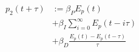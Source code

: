 \begin{equation}
\begin{split}
	p_2(t+\tau) &:= \beta_P E_{p}(t)\\
	&+ \beta_I \sum_{i=0}^\infty E_{p}(t-i\tau)\\
	&+ \beta_D \frac{E_{p}(t)-E_{p}(t-\tau)}{\tau}
\end{split}
\label{ch2:equ:corrective-component-power}
\end{equation}